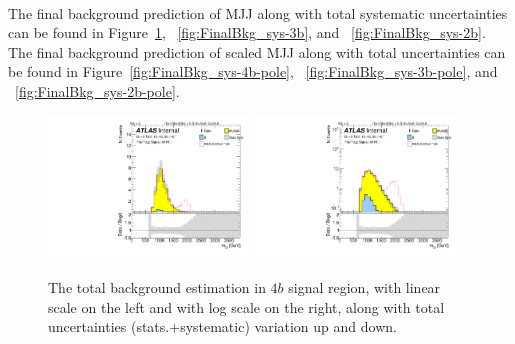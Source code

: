 \paragraph{}
The final background prediction of MJJ along with total systematic uncertainties can be found in Figure~\ref{fig:FinalBkg_sys-4b}, ~\ref{fig:FinalBkg_sys-3b}, and ~\ref{fig:FinalBkg_sys-2b}. The final background prediction of scaled MJJ along with total uncertainties can be found in Figure~\ref{fig:FinalBkg_sys-4b-pole}, ~\ref{fig:FinalBkg_sys-3b-pole}, and ~\ref{fig:FinalBkg_sys-2b-pole}.


\begin{figure}
\begin{center}
\includegraphics[angle=270, width=0.48\textwidth]{./figures/boosted/Signal_Syst/Moriond_bkg_9_FourTag_Signal_mHH_l_blind.pdf}
\includegraphics[angle=270, width=0.48\textwidth]{./figures/boosted/Signal_Syst/Moriond_bkg_9_FourTag_Signal_mHH_l_1_blind.pdf}
\caption{The total background estimation in $4b$ signal region, with linear scale on the left and with log scale on the right, along with total uncertainties (stats.$+$systematic) variation up and down.}
\label{fig:FinalBkg_sys-4b}
\end{center}
\end{figure}


